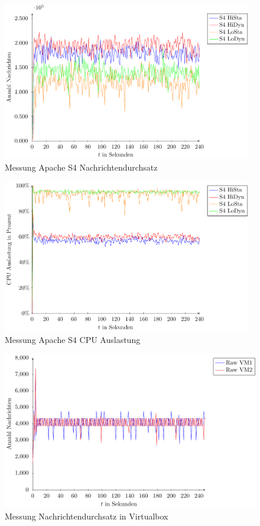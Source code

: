 \begin{figure}
\includegraphics[width=0.97\textwidth]{plots/messungS4Durchsatz.pdf}
\caption{Messung Apache S4 Nachrichtendurchsatz
\label{fig:messungS4Nd}}
\end{figure}
\begin{figure}
\includegraphics[width=0.97\textwidth]{plots/messungS4Cpu.pdf}
\caption{Messung Apache S4 CPU Auslastung
\label{fig:messungS4Cpu}}
\end{figure}



\begin{figure}
\includegraphics[width=1.0\textwidth]{plots/virtualBoxRaw.pdf}
\caption{Messung Nachrichtendurchsatz in Virtualbox
\label{fig:messungMaxNachrichten}}
\end{figure}






